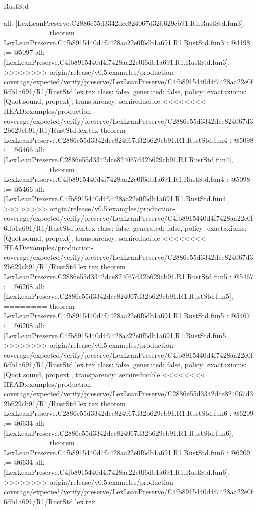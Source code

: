 \begin{lexlean}{RustStd}
\begin{coremodule}
{\begin{coremodule}
{{{{{{  all: [LexLeanPreserve.C2886e55d3342dce824067d32b629cb91.R1.RustStd.fun3],
========
theorem LexLeanPreserve.C4fb8915440d4f7428aa22e0f6db1a691.R1.RustStd.fun3 : @4198 := @5097 {
  all: [LexLeanPreserve.C4fb8915440d4f7428aa22e0f6db1a691.R1.RustStd.fun3],
>>>>>>>> origin/release/v0.5:examples/production-coverage/expected/verify/preserve/LexLeanPreserve/C4fb8915440d4f7428aa22e0f6db1a691/R1/RustStd.lex.tex
  class: false,
  generated: false,
  policy: exact{axioms: [Quot.sound, propext]},
  transparency: semireducible
}
<<<<<<<< HEAD:examples/production-coverage/expected/verify/preserve/LexLeanPreserve/C2886e55d3342dce824067d32b629cb91/R1/RustStd.lex.tex
theorem LexLeanPreserve.C2886e55d3342dce824067d32b629cb91.R1.RustStd.fun4 : @5098 := @5466 {
  all: [LexLeanPreserve.C2886e55d3342dce824067d32b629cb91.R1.RustStd.fun4],
========
theorem LexLeanPreserve.C4fb8915440d4f7428aa22e0f6db1a691.R1.RustStd.fun4 : @5098 := @5466 {
  all: [LexLeanPreserve.C4fb8915440d4f7428aa22e0f6db1a691.R1.RustStd.fun4],
>>>>>>>> origin/release/v0.5:examples/production-coverage/expected/verify/preserve/LexLeanPreserve/C4fb8915440d4f7428aa22e0f6db1a691/R1/RustStd.lex.tex
  class: false,
  generated: false,
  policy: exact{axioms: [Quot.sound, propext]},
  transparency: semireducible
}
<<<<<<<< HEAD:examples/production-coverage/expected/verify/preserve/LexLeanPreserve/C2886e55d3342dce824067d32b629cb91/R1/RustStd.lex.tex
theorem LexLeanPreserve.C2886e55d3342dce824067d32b629cb91.R1.RustStd.fun5 : @5467 := @6208 {
  all: [LexLeanPreserve.C2886e55d3342dce824067d32b629cb91.R1.RustStd.fun5],
========
theorem LexLeanPreserve.C4fb8915440d4f7428aa22e0f6db1a691.R1.RustStd.fun5 : @5467 := @6208 {
  all: [LexLeanPreserve.C4fb8915440d4f7428aa22e0f6db1a691.R1.RustStd.fun5],
>>>>>>>> origin/release/v0.5:examples/production-coverage/expected/verify/preserve/LexLeanPreserve/C4fb8915440d4f7428aa22e0f6db1a691/R1/RustStd.lex.tex
  class: false,
  generated: false,
  policy: exact{axioms: [Quot.sound, propext]},
  transparency: semireducible
}
<<<<<<<< HEAD:examples/production-coverage/expected/verify/preserve/LexLeanPreserve/C2886e55d3342dce824067d32b629cb91/R1/RustStd.lex.tex
theorem LexLeanPreserve.C2886e55d3342dce824067d32b629cb91.R1.RustStd.fun6 : @6209 := @6634 {
  all: [LexLeanPreserve.C2886e55d3342dce824067d32b629cb91.R1.RustStd.fun6],
========
theorem LexLeanPreserve.C4fb8915440d4f7428aa22e0f6db1a691.R1.RustStd.fun6 : @6209 := @6634 {
  all: [LexLeanPreserve.C4fb8915440d4f7428aa22e0f6db1a691.R1.RustStd.fun6],
>>>>>>>> origin/release/v0.5:examples/production-coverage/expected/verify/preserve/LexLeanPreserve/C4fb8915440d4f7428aa22e0f6db1a691/R1/RustStd.lex.tex
}}}}}}}}}}
\end{coremodule}}
\end{coremodule}
\end{lexlean}
